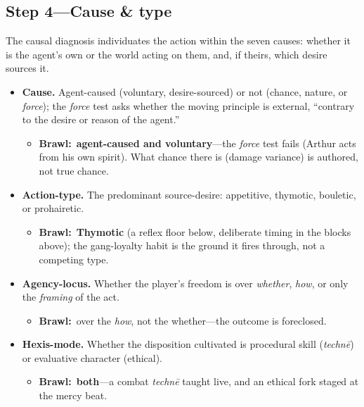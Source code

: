 \documentclass[11pt]{article}
\newcommand{\inb}{\textbf{Brawl:}~}
\begin{document}
\subsection*{Step 4---Cause \& type}
\noindent The causal diagnosis individuates the action within the seven causes: whether it is the agent's own or the world acting on them, and, if theirs, which desire sources it.
\begin{itemize}
  \item \textbf{Cause.} Agent-caused (voluntary, desire-sourced) or not (chance, nature, or \emph{force}); the \emph{force} test asks whether the moving principle is external, ``contrary to the desire or reason of the agent.''
    \begin{itemize}\item \inb \textbf{agent-caused and voluntary}---the \emph{force} test fails (Arthur acts from his own spirit). What chance there is (damage variance) is authored, not true chance.\end{itemize}
  \item \textbf{Action-type.} The predominant source-desire: appetitive, thymotic, bouletic, or prohairetic.
    \begin{itemize}\item \inb \textbf{Thymotic} (a reflex floor below, deliberate timing in the blocks above); the gang-loyalty habit is the ground it fires through, not a competing type.\end{itemize}
  \item \textbf{Agency-locus.} Whether the player's freedom is over \emph{whether}, \emph{how}, or only the \emph{framing} of the act.
    \begin{itemize}\item \inb over the \emph{how}, not the whether---the outcome is foreclosed.\end{itemize}
  \item \textbf{Hexis-mode.} Whether the disposition cultivated is procedural skill (\textit{techn\=e}) or evaluative character (ethical).
    \begin{itemize}\item \inb \textbf{both}---a combat \textit{techn\=e} taught live, and an ethical fork staged at the mercy beat.\end{itemize}
\end{itemize}
\end{document}
